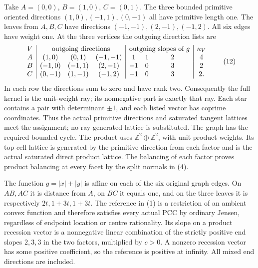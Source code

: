 \documentclass[
  10pt,
]{article}
\begin{document}
Take \(A=(0,0)\), \(B=(1,0)\), \(C=(0,1)\). The three bounded primitive
oriented directions \((1,0),(-1,1),(0,-1)\) all have primitive length
one. The leaves from \(A,B,C\) have directions
\((-1,-1),(2,-1),(-1,2)\). All six edges have weight one. At the three
vertices the outgoing direction lists are \[
 \begin{array}{c|ccc|ccc|c}
 V&\multicolumn{3}{c|}{\text{outgoing directions}}&\multicolumn{3}{c|}{\text{outgoing slopes of }g}&\kappa_V\\
 A&(1,0)&(0,1)&(-1,-1)&1&1&2&4\\
 B&(-1,0)&(-1,1)&(2,-1)&-1&0&3&2\\
 C&(0,-1)&(1,-1)&(-1,2)&-1&0&3&2.
 \end{array}                                                     \tag{12}
\] In each row the directions sum to zero and have rank two.
Consequently the full kernel is the unit-weight ray; its nonnegative
part is exactly that ray. Each star contains a pair with determinant
\(\pm1\), and each listed vector has coprime coordinates. Thus the
actual primitive directions and saturated tangent lattices meet the
assignment; no ray-generated lattice is substituted. The graph has the
required bounded cycle. The product uses
\(\mathbb Z^2\oplus\mathbb Z^2\), with unit product weights. Its top
cell lattice is generated by the primitive direction from each factor
and is the actual saturated direct product lattice. The balancing of
each factor proves product balancing at every facet by the split normals
in (4).

The function \(g=|x|+|y|\) is affine on each of the six original graph
edges. On \(AB,AC\) it is distance from \(A\), on \(BC\) it equals one,
and on the three leaves it is respectively \(2t,1+3t,1+3t\). The
reference in (1) is a restriction of an ambient convex function and
therefore satisfies every actual PCC by ordinary Jensen, regardless of
endpoint location or centre rationality. Its slope on a product
recession vector is a nonnegative linear combination of the strictly
positive end slopes \(2,3,3\) in the two factors, multiplied by \(c>0\).
A nonzero recession vector has some positive coefficient, so the
reference is positive at infinity. All mixed end directions are
included.
\end{document}
